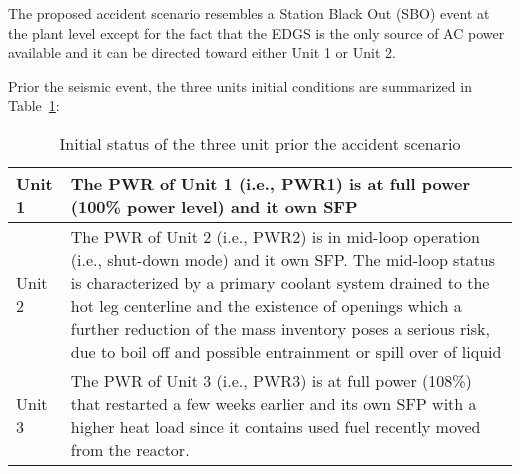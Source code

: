 The proposed accident scenario resembles a Station Black Out (SBO) event at the plant level except for the 
fact that the EDGS is the only source of AC power available and it can be directed toward either Unit 1 or Unit 2.

Prior the seismic event, the three units initial conditions are summarized in Table~\ref{tab:unitsStatus}:

\begin{table}
  \begin{tabular}{ | l | p{10cm} | }
    \hline      
      Unit 1 &  The PWR of Unit 1 (i.e., PWR1) is at full power (100\% power level) and it own SFP \\ \hline
      Unit 2 &  The PWR of Unit 2 (i.e., PWR2) is in mid-loop operation (i.e., shut-down mode) and it own SFP. 
                The mid-loop status is characterized by a primary coolant system drained to the 
                hot leg centerline and the existence of openings which a further reduction of 
                the mass inventory poses a serious risk, due to boil off and possible entrainment 
                or spill over of liquid\\ \hline
      Unit 3 &  The PWR of Unit 3 (i.e., PWR3) is at full power (108\%) that restarted a few weeks 
                earlier and its own SFP with a higher heat load since it contains used fuel recently 
                moved from the reactor. \\
    \hline  
  \end{tabular}
  \caption{Initial status of the three unit prior the accident scenario}
  \label{tab:unitsStatus}
\end{table}



